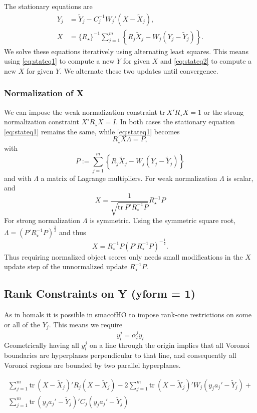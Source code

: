 \documentclass[
  12pt,
]{article}
\begin{document}
The stationary equations are
\begin{align}
Y_j&=\tilde Y_j-C_j^{-1}W_j'(X-\tilde X_j),\label{eq:stateq1}\\
X&=\{R_\star\}^{-1}\sum_{j=1}^m\left\{R_j\tilde X_j-W_j(Y_j-\tilde Y_j)\right\}.\label{eq:stateq2}
\end{align}
We solve these equations iteratively using alternating least squares. This
means using \eqref{eq:stateq1} to compute a new \(Y\) for given \(X\) and \eqref{eq:stateq2} to compute a new \(X\) for given \(Y\). We alternate these two updates until convergence.

\subsubsection{Normalization of X}\label{normalization-of-x}

We can impose the weak normalization constraint \(\text{tr}\ X'R_\star X=1\) or the
strong normalization constraint \(X'R_\star X=I\). In both cases the stationary
equation \eqref{eq:stateq1} remains the same, while \eqref{eq:stateq1} becomes
\[
R_\star X\Lambda=P,
\]
with
\[
P:=\sum_{j=1}^m\left\{R_j\tilde X_j-W_j(Y_j-\tilde Y_j)\right\}
\]
and with \(\Lambda\) a matrix of Lagrange multipliers. For weak normalization \(\Lambda\)
is scalar, and
\[
X=\frac{1}{\sqrt{\text{tr}\ P'R_\star^{-1}P}}R_\star^{-1}P
\]
For strong normalization \(\Lambda\) is symmetric. Using the symmetric square root, \(\Lambda=(P'R_\star^{-1}P)^\frac12\) and thus
\[
X=R_\star^{-1}P(P'R_\star^{-1}P)^{-\frac12}.
\]
Thus requiring normalized object scores only needs small modifications in the \(X\) update step of the unnormalized update \(R_\star^{-1}P\).

\subsection{Rank Constraints on Y (yform = 1)}\label{rank-constraints-on-y-yform-1}

As in homals it is possible in smacofHO to impose rank-one restrictions on some or all of the \(Y_j\). This means we require
\[
y_l^j=\alpha_{l}^jy_l^{\ }{}
\]
Geometrically having all \(y_l^j\) on a line through the origin implies that
all Voronoi boundaries are hyperplanes perpendicular to that line, and consequently all Voronoi regions are bounded by two parallel hyperplanes.

\begin{multline}
\sum_{j=1}^m\text{tr}\ (X-\tilde X_j)'R_j(X-\tilde X_j)-2\sum_{j=1}^m\text{tr}\ (X-\tilde X_j)'W_j(y_ja_j'-\tilde Y_j)+\\
\sum_{j=1}^m\text{tr}\ (y_ja_j'-\tilde Y_j)'C_j(y_ja_j'-\tilde Y_j)
\end{multline}
\end{document}
